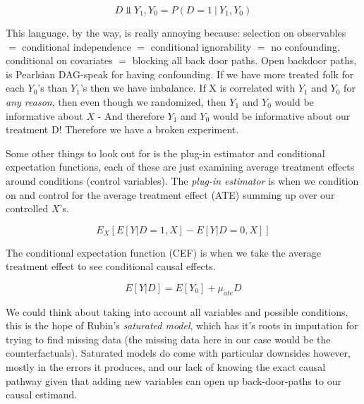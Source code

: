 \documentclass[12pt]{article}\usepackage[]{graphicx}\usepackage[]{color}
\begin{document}
\begin{flushleft}
\begin{equation}
D \Vbar Y_1, Y_0 = P(D=1 ~ | ~ Y_1, Y_0)
\end{equation}

This language, by the way, is really annoying because: selection on observables $=$ conditional independence $=$ conditional ignorability $=$ no confounding, conditional on covariates $=$ blocking all back door paths.    Open backdoor paths, is Pearlsian DAG-speak for having confounding. If we have more treated folk for each $Y_0$'s than $Y_1$'s then we have imbalance. If X is correlated with $Y_1$ and $Y_0$ for \textit{any reason}, then even though we randomized, then $Y_1$ and $Y_0$ would be informative about $X$ - And therefore $Y_1$ and $Y_0$ would be informative about our treatment D! Therefore we have a broken experiment.

Some other things to look out for is the plug-in estimator and conditional expectation functions, each of these are just examining average treatment effects around conditions (control variables). The \textit{plug-in estimator} is when we condition on and control for the average treatment effect (ATE) summing up over our controlled $X$'s.

\begin{equation}
E_X[E[Y |  D = 1, X] − E[Y |D = 0,X]]
\end{equation}

\noindent The conditional expectation function (CEF) is when we take the average treatment effect to see conditional causal effects.

\begin{equation}
E[Y |D] = E[Y_0] + \mu_{ate}D
\end{equation}

We could think about taking into account all variables and possible conditions, this is the hope of Rubin's \textit{saturated model}, which has it's roots in imputation for trying to find missing data (the missing data here in our case would be the counterfactuals). Saturated models do come with particular downsides however, mostly in the errors it produces, and our lack of knowing the exact causal pathway given that adding new variables can open up back-door-paths to our causal estimand.  


\hfill \\


\end{flushleft}
\end{document}
